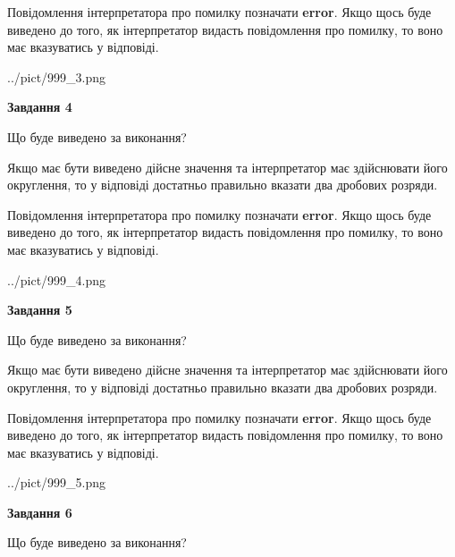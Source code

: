 \documentclass[12pt, ukrainian]{article}
\begin{document}
{\begin {Large}
Повідомлення інтерпретатора про помилку позначати \textbf{error}.
Якщо щось буде виведено до того, як інтерпретатор видасть повідомлення про помилку, 
то воно має вказуватись у відповіді. \par

\begin{center}
	{../pict/999_3.png}
\end{center}
\newpage

{\begin {center}\textbf{Завдання 4}\end {center}}\par
Що буде виведено за виконання? \par

Якщо має бути виведено дійсне значення та інтерпретатор має здійснювати його округлення, 
то у відповіді достатньо правильно вказати два дробових розряди.

Повідомлення інтерпретатора про помилку позначати \textbf{error}.
Якщо щось буде виведено до того, як інтерпретатор видасть повідомлення про помилку, 
то воно має вказуватись у відповіді. \par

\begin{center}
	{../pict/999_4.png}
\end{center}
\newpage

{\begin {center}\textbf{Завдання 5}\end {center}}\par
Що буде виведено за виконання? \par

Якщо має бути виведено дійсне значення та інтерпретатор має здійснювати його округлення, 
то у відповіді достатньо правильно вказати два дробових розряди.

Повідомлення інтерпретатора про помилку позначати \textbf{error}.
Якщо щось буде виведено до того, як інтерпретатор видасть повідомлення про помилку, 
то воно має вказуватись у відповіді. \par

\begin{center}
	{../pict/999_5.png}
\end{center}
\newpage

{\begin {center}\textbf{Завдання 6}\end {center}}\par
Що буде виведено за виконання? \par


\end{Large}}
\end{document}
